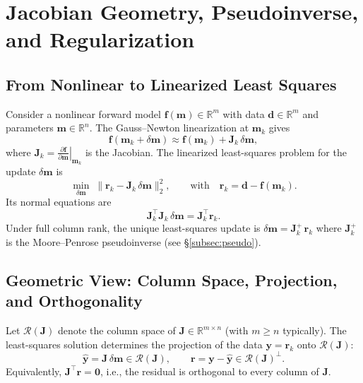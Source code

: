 

\section{Jacobian Geometry, Pseudoinverse, and Regularization}

\subsection{From Nonlinear to Linearized Least Squares}
Consider a nonlinear forward model $\mathbf{f}(\mathbf{m}) \in \mathbb{R}^m$ with data $\mathbf{d}\in\mathbb{R}^m$ and parameters $\mathbf{m}\in\mathbb{R}^n$. The Gauss--Newton linearization at $\mathbf{m}_k$ gives
\[
\mathbf{f}(\mathbf{m}_k+\delta\mathbf{m}) \approx \mathbf{f}(\mathbf{m}_k) + \mathbf{J}_k\,\delta\mathbf{m},
\]
where $\mathbf{J}_k = \left.\frac{\partial \mathbf{f}}{\partial \mathbf{m}}\right|_{\mathbf{m}_k}$ is the Jacobian. The linearized least-squares problem for the update $\delta\mathbf{m}$ is
\[
\min_{\delta\mathbf{m}} \; \|\mathbf{r}_k - \mathbf{J}_k \, \delta\mathbf{m}\|_2^2, \qquad \text{with} \quad \mathbf{r}_k = \mathbf{d} - \mathbf{f}(\mathbf{m}_k).
\]
Its normal equations are
\[
\mathbf{J}_k^\top \mathbf{J}_k \,\delta\mathbf{m} = \mathbf{J}_k^\top \mathbf{r}_k.
\]
Under full column rank, the unique least-squares update is $\delta\mathbf{m} = \mathbf{J}_k^{+}\,\mathbf{r}_k$ where $\mathbf{J}_k^{+}$ is the Moore--Penrose pseudoinverse (see \S\ref{subsec:pseudo}).

\subsection{Geometric View: Column Space, Projection, and Orthogonality}
Let $\mathcal{R}(\mathbf{J})$ denote the column space of $\mathbf{J}\in\mathbb{R}^{m\times n}$ (with $m\ge n$ typically). The least-squares solution determines the projection of the data $\mathbf{y}=\mathbf{r}_k$ onto $\mathcal{R}(\mathbf{J})$:
\[
\widehat{\mathbf{y}} = \mathbf{J}\,\delta\mathbf{m} \in \mathcal{R}(\mathbf{J}), \qquad
\mathbf{r} = \mathbf{y} - \widehat{\mathbf{y}} \in \mathcal{R}(\mathbf{J})^\perp.
\]
Equivalently, $\mathbf{J}^\top \mathbf{r} = \mathbf{0}$, i.e., the residual is orthogonal to every column of $\mathbf{J}$.

